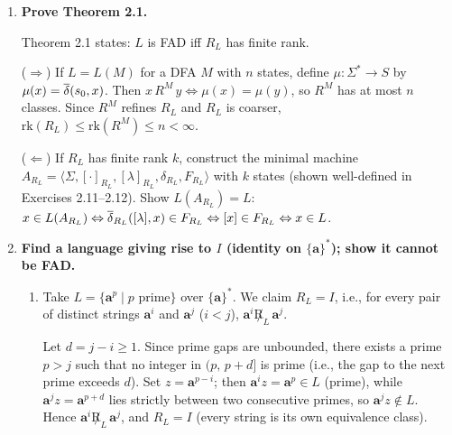 \begin{enumerate}[{2.}1.]
$i=0$: $\DBAR(s_0,uw')=\DBAR(\DBAR(s_0,u),w')=\DBAR(s,w')$. And $\DBAR(s_0,uvw')=\DBAR(\DBAR(s_0,uv),w')=\DBAR(s,w')$ (since $\DBAR(s,v)=s$). Equal. \checkmark

$i\to i+1$: By the inner induction, $\DBAR(s_0,uv^i)=s$ (base: $\DBAR(s_0,u)=s$; step: $\DBAR(s_0,uv^{i+1})=\DBAR(\DBAR(s_0,uv^i),v)=\DBAR(s,v)=s$). Therefore
\[
\DBAR(s_0,uv^{i+1}w')=\DBAR(\DBAR(s_0,uv^i),vw')=\DBAR(s,vw')=\DBAR(\DBAR(s,v),w')=\DBAR(s,w').
\]

So $\DBAR(s_0,uv^iw')=\DBAR(s,w')=f$ for all $i$. $\square$

\item \textbf{Prove Theorem 2.1.}

Theorem 2.1 states: $L$ is FAD iff $R_L$ has finite rank.

($\Rightarrow$) If $L=L(M)$ for a DFA $M$ with $n$ states, define $\mu: \Sigma^*\to S$ by $\mu(x)=\overline{\delta}(s_0,x)$. Then $x\,R^M\,y\Leftrightarrow\mu(x)=\mu(y)$, so $R^M$ has at most $n$ classes. Since $R^M$ refines $R_L$ and $R_L$ is coarser, $\mathrm{rk}(R_L)\leq\mathrm{rk}(R^M)\leq n<\infty$.

($\Leftarrow$) If $R_L$ has finite rank $k$, construct the minimal machine $A_{R_L}=\langle\Sigma,[{\cdot}]_{R_L},[\lambda]_{R_L},\delta_{R_L},F_{R_L}\rangle$ with $k$ states (shown well-defined in Exercises 2.11--2.12). Show $L(A_{R_L})=L$: $x\in L(A_{R_L})\Leftrightarrow\overline{\delta}_{R_L}([\lambda],x)\in F_{R_L}\Leftrightarrow[x]\in F_{R_L}\Leftrightarrow x\in L$.

\item \textbf{Find a language giving rise to $I$ (identity on $\{\mathbf{a}\}^*$); show it cannot be FAD.}

\begin{enumerate}
\item Take $L=\{\mathbf{a}^p\mid p\text{ prime}\}$ over $\{\mathbf{a}\}^*$. We claim $R_L=I$, i.e., for every pair of distinct strings $\mathbf{a}^i$ and $\mathbf{a}^j$ ($i<j$), $\mathbf{a}^i\not R_L\,\mathbf{a}^j$.

Let $d=j-i\geq 1$. Since prime gaps are unbounded, there exists a prime $p>j$ such that no integer in $(p,\,p+d]$ is prime (i.e., the gap to the next prime exceeds $d$). Set $z=\mathbf{a}^{p-i}$; then $\mathbf{a}^i z=\mathbf{a}^p\in L$ (prime), while $\mathbf{a}^j z=\mathbf{a}^{p+d}$ lies strictly between two consecutive primes, so $\mathbf{a}^j z\notin L$. Hence $\mathbf{a}^i\not R_L\,\mathbf{a}^j$, and $R_L=I$ (every string is its own equivalence class).


\end{enumerate}
\end{enumerate}
